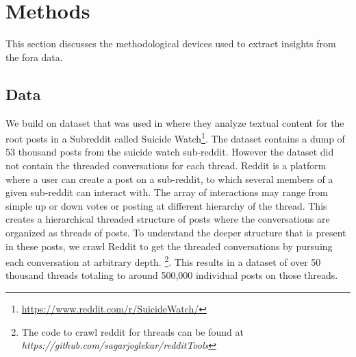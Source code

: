 \section{Methods}
This section discusses the methodological devices used to extract insights from the fora data.

\subsection{Data}
We build on dataset that was used in \cite{gkotsis2017characterisation} where they analyze textual content for the root posts in a Subreddit called Suicide Watch\footnote{\url{https://www.reddit.com/r/SuicideWatch/}}. The dataset contains a dump of 53 thousand posts from the suicide watch sub-reddit.
However the dataset did not contain the threaded conversations for each thread. Reddit is a platform where a user can create a post on a sub-reddit, to which several members of a given sub-reddit can interact with. The array of interactions may range from simple up or down votes or posting at different hierarchy of the thread. This creates a hierarchical threaded structure of posts where the conversations are organized as threads of posts. To understand the deeper structure that is present in these posts,  we crawl Reddit to get the threaded conversations by pursuing each conversation at arbitrary depth. \footnote{The code to crawl reddit for threads can be found at \textit{https://github.com/sagarjoglekar/redditTools}}. This results in a dataset of over 50 thousand threads totaling to around 500,000 individual posts on those threads.  

